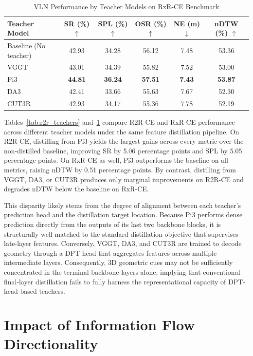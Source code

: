 \begin{table}[t]
    \centering
    \caption{VLN Performance by Teacher Models on RxR-CE Benchmark}
    \label{tab:rxr_teachers}
    \begin{tabular}{lccccc}
        \toprule
        Teacher Model & SR (\%) $\uparrow$ & SPL (\%) $\uparrow$ & OSR (\%) $\uparrow$ & NE (m) $\downarrow$ & nDTW (\%) $\uparrow$ \\
        \midrule
        Baseline (No teacher) & 42.93 & 34.28 & 56.12 & 7.48 & 53.36 \\
        VGGT & 43.01 & 34.39 & 55.82 & 7.52 & 53.00 \\
        Pi3 & \textbf{44.81} & \textbf{36.24} & \textbf{57.51} & \textbf{7.43} & \textbf{53.87} \\
        DA3 & 42.41 & 33.66 & 55.63 & 7.67 & 52.30 \\
        CUT3R & 42.93 & 34.17 & 55.36 & 7.78 & 52.19 \\
        \bottomrule
    \end{tabular}
\end{table}

Tables~\ref{tab:r2r_teachers} and~\ref{tab:rxr_teachers} compare R2R-CE and RxR-CE performance across different teacher models under the same feature distillation pipeline. On R2R-CE, distilling from Pi3 yields the largest gains across every metric over the non-distilled baseline, improving SR by 5.06 percentage points and SPL by 5.05 percentage points. On RxR-CE as well, Pi3 outperforms the baseline on all metrics, raising nDTW by 0.51 percentage points. By contrast, distilling from VGGT, DA3, or CUT3R produces only marginal improvements on R2R-CE and degrades nDTW below the baseline on RxR-CE.

This disparity likely stems from the degree of alignment between each teacher's prediction head and the distillation target location. Because Pi3 performs dense prediction directly from the outputs of its last two backbone blocks, it is structurally well-matched to the standard distillation objective that supervises late-layer features. Conversely, VGGT, DA3, and CUT3R are trained to decode geometry through a DPT head that aggregates features across multiple intermediate layers. Consequently, 3D geometric cues may not be sufficiently concentrated in the terminal backbone layers alone, implying that conventional final-layer distillation fails to fully harness the representational capacity of DPT-head-based teachers.

\section{Impact of Information Flow Directionality}
\label{sec:exp_direction}

